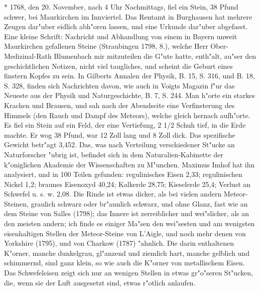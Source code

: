 \documentclass[a4paper, 11pt, oneside, polutonikogreek, german]{article}
\begin{document}
* 1768, den 20. November, nach 4 Uhr Nachmittags, fiel ein Stein, 38 Pfund schwer, bei Maurkirchen im Innviertel. Das Rentamt in Burghausen hat mehrere Zeugen dar"uber eidlich abh"oren lassen, und eine Urkunde dar"uber abgefasst. Eine kleine Schrift: Nachricht und Abhandlung von einem in Bayern unweit Maurkirchen gefallenen Steine (Straubingen 1798, 8.), welche Herr Ober-Medizinal-Rath Blumenbach mir mitzuteilen die G"ute hatte, enth"alt, au"ser den geschichtlichen Notizen, nicht viel taugliches, und scheint die Geburt eines finstern Kopfes zu sein. In Gilberts Annalen der Physik, B. 15, S. 316, und B. 18, S. 328, finden sich Nachrichten davon, wie auch in Voigts Magazin f"ur das Neueste aus der Physik und Naturgeschichte, B. 7, S. 244. Man h"orte ein starkes Krachen und Brausen, und sah nach der Abendseite eine Verfinsterung des Himmels (den Rauch und Dampf des Meteors), welche gleich hernach aufh"orte. Es fiel ein Stein auf ein Feld, der eine Vertiefung, 2 1/2 Schuh tief, in die Erde machte. Er wog 38 Pfund, war 12 Zoll lang und 8 Zoll dick. Das spezifische Gewicht betr"agt 3,452. Das, was nach Verteilung verschiedener St"ucke an Naturforscher "ubrig ist, befindet sich in dem Naturalien-Kabinette der k"oniglichen Akademie der Wissenschaften zu M"unchen. Maximus Imhof hat ihn analysiert, und in 100 Teilen gefunden: regulinisches Eisen 2,33; regulinischen Nickel 1,2; braunes Eisenoxyd 40,24; Kalkerde 28,75; Kieselerde 25,4; Verlust an Schwefel u. s. w. 2,08. Die Rinde ist etwas dicker, als bei vielen andern Meteor-Steinen, graulich schwarz oder br"aunlich schwarz, und ohne Glanz, fast wie an dem Steine von Salles (1798); das Innere ist zerreiblicher und wei"slicher, als an den meisten andern; ich finde es einiger Ma"sen den wei"sesten und am wenigsten eisenhaltigen Stellen der Meteor-Steine von L'Aigle, und noch mehr denen von Yorkshire (1795), und von Charkow (1787) "ahnlich. Die darin enthaltenen K"orner, manche dunkelgrau, gl"anzend und ziemlich hart, manche gelblich und schimmernd, sind ganz klein, so wie auch die K"orner von metallischem Eisen. Das Schwefeleisen zeigt sich nur an wenigen Stellen in etwas gr"o"seren St"ucken, die, wenn sie der Luft ausgesetzt sind, etwas r"otlich anlaufen.
\end{document}
